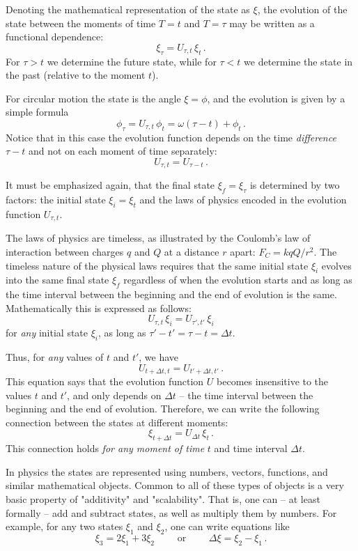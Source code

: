 Denoting the mathematical representation of the state as $\xi$, the evolution of the state between the moments of time $T=t$ and $T=\tau$ may be written as a functional dependence:
\[
\xi_\tau = U_{\tau, t}\,\xi_t\,.
\]
For $\tau > t$ we determine the future state, while for $\tau < t$ we determine the state in the past (relative to the moment $t$).
\begin{myExample}
	For circular motion the state is the angle $\xi=\phi$, and the evolution is given by a simple formula
	\[
	\phi_\tau = U_{\tau, t}\,\phi_t=\omega (\tau - t) + \phi_t\,.	
	\]
	Notice that in this case the evolution function depends on the time \emph{difference} $\tau-t$ and not on each moment of time separately:
	\[
	U_{\tau, t} = U_{\tau-t}\,.
	\]
\end{myExample}
It must be emphasized again, that the final state $\xi_f=\xi_\tau$ is determined by two factors: the initial state $\xi_i=\xi_t$ and the laws of physics encoded in the evolution function $U_{\tau, t}$. 

The laws of physics are timeless, as illustrated by the Coulomb's law of interaction between charges $q$ and $Q$ at a distance $r$ apart: $F_C=k qQ/r^2$. The timeless nature of the physical laws requires that the same initial state $\xi_i$ evolves into the same final state $\xi_f$ regardless of when the evolution starts and as long as the time interval between the beginning and the end of evolution is the same. Mathematically this is expressed as follows:
\[
U_{\tau, t}\,\xi_i  = U_{\tau', t'}\,\xi_i
\]
for \emph{any} initial state $\xi_i$, as long as $\tau'-t'=\tau-t=\Delta t$.

Thus, for \emph{any} values of $t$ and $t'$, we have
\[
U_{t+\Delta t, t}  = U_{t'+\Delta t, t'}\,.
\]
This equation says that the evolution function $U$ becomes insensitive to the values $t$ and $t'$, and only depends on $\Delta t$ -- the time interval between the beginning and the end of evolution. Therefore, we can write the following connection between the states at different moments:
\[
\xi_{t+\Delta t} = U_{\Delta t}\,\xi_t\,.
\]
This connection holds \emph{for any moment of time} $t$ and time interval $\Delta t$.

In physics the states are represented using numbers, vectors, functions, and similar mathematical objects. Common to all of these types of objects is a very basic property of "additivity" and "scalability". That is, one can -- at least formally -- add and subtract states, as well as multiply them by numbers. For example, for any two states $\xi_1$ and $\xi_2$, one can write  equations like
\[
\xi_3 = 2\xi_1 + 3\xi_2\qquad\textrm{ or }\qquad \Delta \xi = \xi_2 - \xi_1\,.
\]


